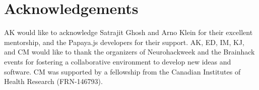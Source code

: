 \section{Acknowledgements}
AK would like to acknowledge Satrajit Ghosh and Arno Klein for their excellent mentorship, and the Papaya.js developers for their support. AK, ED, IM, KJ, and CM would like to thank the organizers of Neurohackweek and the Brainhack events for fostering a collaborative environment to develop new ideas and software. CM was supported by a fellowship from the Canadian Institutes of Health Research (FRN-146793). 

